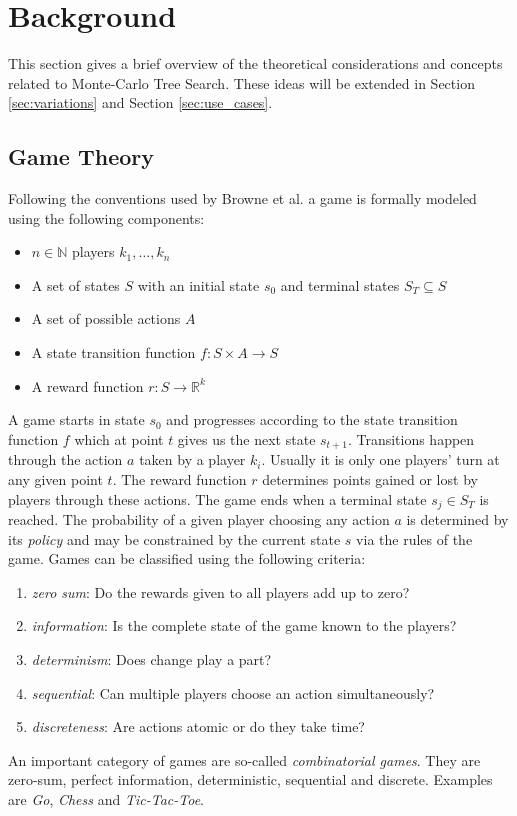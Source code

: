\section{Background}
\label{sec:background}
This section gives a brief overview of the theoretical considerations and concepts related to Monte-Carlo Tree Search. These ideas will be extended in Section \ref{sec:variations} and Section \ref{sec:use_cases}.
\subsection{Game Theory}
\label{ss:game_theory}
Following the conventions used by Browne et al.\cite{browne2012survey} a game is formally modeled using the following components:
\begin{itemize}[noitemsep]
    \item $n \in \mathbb{N}$ players $k_1, \ldots, k_n$
    \item A set of states $S$ with an initial state $s_0$ and terminal states $S_T \subseteq S$
    \item A set of possible actions $A$
    \item A state transition function $f: S \times A \to S$
    \item A reward function $r: S \to \mathbb{R}^k$
\end{itemize}
A game starts in state $s_0$ and progresses according to the state transition function $f$ which at point $t$ gives us the next state $s_{t+1}$. Transitions happen through the action $a$ taken by a player $k_i$. Usually it is only one players' turn at any given point $t$. The reward function $r$ determines points gained or lost by players through these actions. The game ends when a terminal state $s_j \in S_T$ is reached. The probability of a given player choosing any action $a$ is determined by its \textit{policy} and may be constrained by the current state $s$ via the rules of the game. Games can be classified using the following criteria:
\begin{enumerate}[label=\alph*)]
    \item \textit{zero sum}: Do the rewards given to all players add up to zero?
    \item \textit{information}: Is the complete state of the game known to the players?
    \item \textit{determinism}: Does change play a part?
    \item \textit{sequential}: Can multiple players choose an action simultaneously?
    \item \textit{discreteness}: Are actions atomic or do they take time? 
\end{enumerate}
An important category of games are so-called \textit{combinatorial games}. They are zero-sum, perfect information, deterministic, sequential and discrete. Examples are \textit{Go}, \textit{Chess} and \textit{Tic-Tac-Toe}.

